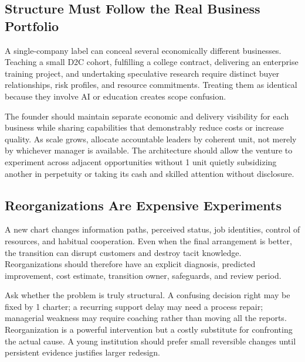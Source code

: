 \subsection{Structure Must Follow the Real Business Portfolio}
\label{sec:structure_follows_portfolio}

A single-company label can conceal several economically different businesses. Teaching a small D2C cohort, fulfilling a college contract, delivering an enterprise training project, and undertaking speculative research require distinct buyer relationships, risk profiles, and resource commitments. Treating them as identical because they involve AI or education creates scope confusion.

The founder should maintain separate economic and delivery visibility for each business while sharing capabilities that demonstrably reduce costs or increase quality. As scale grows, allocate accountable leaders by coherent unit, not merely by whichever manager is available. The architecture should allow the venture to experiment across adjacent opportunities without 1 unit quietly subsidizing another in perpetuity or taking its cash and skilled attention without disclosure.

\subsection{Reorganizations Are Expensive Experiments}
\label{sec:reorgs_expensive_experiments}

A new chart changes information paths, perceived status, job identities, control of resources, and habitual cooperation. Even when the final arrangement is better, the transition can disrupt customers and destroy tacit knowledge. Reorganizations should therefore have an explicit diagnosis, predicted improvement, cost estimate, transition owner, safeguards, and review period.

Ask whether the problem is truly structural. A confusing decision right may be fixed by 1 charter; a recurring support delay may need a process repair; managerial weakness may require coaching rather than moving all the reports. Reorganization is a powerful intervention but a costly substitute for confronting the actual cause. A young institution should prefer small reversible changes until persistent evidence justifies larger redesign.
